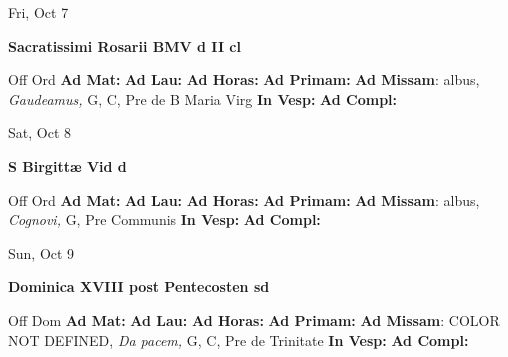 \documentclass[10pt]{memoir}
\begin{document}
\begin{center}
\begin{minipage}{3.5in}
\vspace{2em}
\begin{center}Fri, Oct 7
\end{center}
\textbf{ \large Sacratissimi Rosarii BMV
\textnormal{\normalsize d II cl}}

\begin{justify}Off Ord
\textbf{Ad Mat: }
\textbf{Ad Lau: }
\textbf{Ad Horas: }
\textbf{Ad Primam: }\textbf{Ad Missam}: albus, \textit{Gaudeamus,} G, C, Pre de B Maria Virg
\textbf{In Vesp: }
\textbf{Ad Compl: }
\end{justify}
\end{minipage}
\end{center}

\begin{center}
\begin{minipage}{3.5in}
\vspace{2em}
\begin{center}Sat, Oct 8
\end{center}
\textbf{ \large S Birgittæ Vid
\textnormal{\normalsize d}}

\begin{justify}Off Ord
\textbf{Ad Mat: }
\textbf{Ad Lau: }
\textbf{Ad Horas: }
\textbf{Ad Primam: }\textbf{Ad Missam}: albus, \textit{Cognovi,} G, Pre Communis
\textbf{In Vesp: }
\textbf{Ad Compl: }
\end{justify}
\end{minipage}
\end{center}

\begin{center}
\begin{minipage}{3.5in}
\vspace{2em}
\begin{center}Sun, Oct 9
\end{center}
\textbf{ \large Dominica XVIII post Pentecosten
\textnormal{\normalsize sd}}

\begin{justify}Off Dom
\textbf{Ad Mat: }
\textbf{Ad Lau: }
\textbf{Ad Horas: }
\textbf{Ad Primam: }\textbf{Ad Missam}: COLOR NOT DEFINED, \textit{Da pacem,} G, C, Pre de Trinitate
\textbf{In Vesp: }
\textbf{Ad Compl: }
\end{justify}
\end{minipage}
\end{center}
\end{document}
